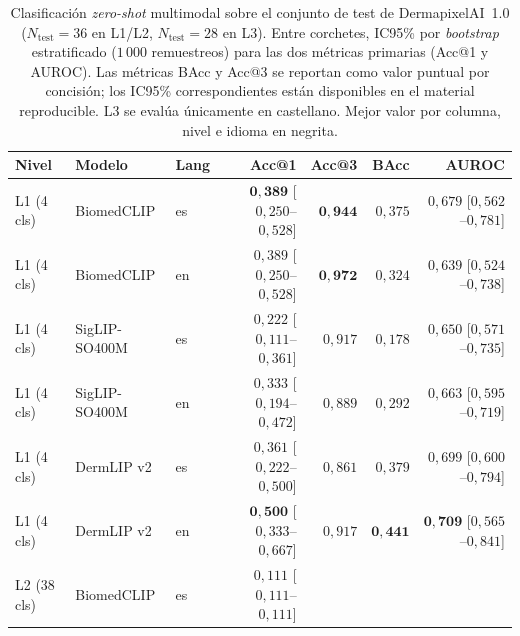 \begin{table}[H]
\centering
\footnotesize
\setlength{\tabcolsep}{4pt}
\renewcommand{\arraystretch}{0.95}
\caption{Clasificación \emph{zero-shot} multimodal sobre el
conjunto de test de DermapixelAI~1.0 ($N_{\mathrm{test}} = 36$ en
L1/L2, $N_{\mathrm{test}} = 28$ en L3). Entre corchetes, IC95\%
por \emph{bootstrap} estratificado ($1\,000$ remuestreos) para
las dos métricas primarias (Acc@1 y AUROC). Las métricas BAcc y
Acc@3 se reportan como valor puntual por concisión; los IC95\%
correspondientes están disponibles en el material reproducible.
L3 se evalúa únicamente en castellano. Mejor valor por columna,
nivel e idioma en negrita.}
\label{tab:dermapixel-zs}
\begin{tabular}{lllrrrr}
\hline
Nivel & Modelo & Lang & Acc@1 & Acc@3 & BAcc & AUROC \\
\hline
L1 (4 cls)   & BiomedCLIP    & es & $\mathbf{0{,}389}$ [$0{,}250$--$0{,}528$]
                                  & $\mathbf{0{,}944}$
                                  & $0{,}375$
                                  & $0{,}679$ [$0{,}562$--$0{,}781$] \\
L1 (4 cls)   & BiomedCLIP    & en & $0{,}389$ [$0{,}250$--$0{,}528$]
                                  & $\mathbf{0{,}972}$
                                  & $0{,}324$
                                  & $0{,}639$ [$0{,}524$--$0{,}738$] \\
L1 (4 cls)   & SigLIP-SO400M & es & $0{,}222$ [$0{,}111$--$0{,}361$]
                                  & $0{,}917$
                                  & $0{,}178$
                                  & $0{,}650$ [$0{,}571$--$0{,}735$] \\
L1 (4 cls)   & SigLIP-SO400M & en & $0{,}333$ [$0{,}194$--$0{,}472$]
                                  & $0{,}889$
                                  & $0{,}292$
                                  & $0{,}663$ [$0{,}595$--$0{,}719$] \\
L1 (4 cls)   & DermLIP v2    & es & $0{,}361$ [$0{,}222$--$0{,}500$]
                                  & $0{,}861$
                                  & $0{,}379$
                                  & $0{,}699$ [$0{,}600$--$0{,}794$] \\
L1 (4 cls)   & DermLIP v2    & en & $\mathbf{0{,}500}$ [$0{,}333$--$0{,}667$]
                                  & $0{,}917$
                                  & $\mathbf{0{,}441}$
                                  & $\mathbf{0{,}709}$ [$0{,}565$--$0{,}841$] \\
\hline
L2 (38 cls)  & BiomedCLIP    & es & $0{,}111$ [$0{,}111$--$0{,}111$]

\end{tabular}
\end{table}
